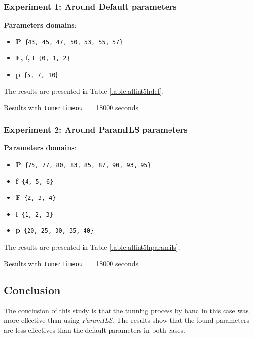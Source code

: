 \subsubsection{Experiment 1: Around Default parameters}

{\bf Parameters domains}:

\begin{itemize}[itemsep=0.2mm]
	\item {\bf P}\texttt{ \{43, 45, 47, 50, 53, 55, 57\}}
	\item {\bf F, f, l}\texttt{ \{0, 1, 2\}}
	\item {\bf p}\texttt{ \{5, 7, 10\}}
\end{itemize}

The results are presented in Table \ref{table:allint5hdef}.

\begin{table}[H] 
\caption{Results with \texttt{tunerTimeout} = 18000 seconds}
\centering 
\renewcommand{\arraystretch}{1.2}
\label{table:allint5hdef}
\end{table}

\subsubsection{ Experiment 2: Around ParamILS parameters}

{\bf Parameters domains}:

\begin{itemize}[itemsep=0.2mm]
	\item {\bf P}\texttt{ \{75, 77, 80, 83, 85, 87, 90, 93, 95\}}
	\item {\bf f}\texttt{ \{4, 5, 6\}}
	\item {\bf F}\texttt{ \{2, 3, 4\}}
	\item {\bf l}\texttt{ \{1, 2, 3\}}
	\item {\bf p}\texttt{ \{20, 25, 30, 35, 40\}}
\end{itemize}

The results are presented in Table \ref{table:allint5hparamils}.

\begin{table}[H] 
\caption{Results with \texttt{tunerTimeout} = 18000 seconds}
\centering 
\renewcommand{\arraystretch}{1.2}
\label{table:allint5hparamils}
\end{table}

\subsection{Conclusion}

The conclusion of this study is that the tunning process by hand in this case was more effective than using {\it ParamILS}. The results show that the found parameters are less effectives than the default parameters in both cases.